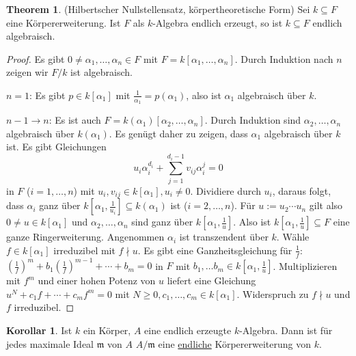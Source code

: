 \documentclass[
twoside=semi,
fontsize=12,
DIV=12, 
cleardoublepage=current,
leqno,
headings=optiontoheadandtoc, 
toc=idx
]{scrbook}
\newcommand{\brac}[1]{\left( #1 \right)}
\newcommand{\emphasize}[1]{\underline{#1}}
\theoremstyle{definition}
\newtheorem{korollar}[definition]{Korollar}
\newtheorem{theorem}[definition]{Theorem}
\begin{document}
	\begin{theorem}\label{1.2.9} (Hilbertscher Nullstellensatz, k\"orpertheoretische Form)\newline
		Sei $k \subseteq F$ eine K\"orpererweiterung. Ist $F$ als $k$-Algebra endlich erzeugt, so ist $k \subseteq F$ endlich algebraisch.
	\end{theorem}
	
	\begin{proof}\hfill\newline
		Es gibt $0\neq \alpha_1, \dots, \alpha_n \in F$ mit $F = k[\alpha_1, \dots, \alpha_n]$. Durch Induktion nach $n$ zeigen wir $F/k$ ist algebraisch.
		
		\noindent $n = 1$: Es gibt $p \in k[\alpha_1]$ mit $\frac{1}{\alpha_1} = p(\alpha_1)$, also ist $\alpha_1$ algebraisch \"uber $k$.
		
		\medskip\noindent
		$n-1 \to n$: Es ist auch $F = k(\alpha_1)[\alpha_2, \dots, \alpha_n]$. Durch Induktion sind $\alpha_2, \dots, \alpha_n$ algebraisch \"uber $k(\alpha_1)$. Es gen\"ugt daher zu zeigen,
		dass $\alpha_1$ algebraisch \"uber $k$ ist. Es gibt Gleichungen
			\[u_i\alpha_i^{d_i} + \sum_{j=1}^{d_i-1} v_{ij}\alpha_i^j = 0\]
		in $F$ ($i = 1, \dots, n$) mit $u_i, v_{ij} \in k[\alpha_1], u_i \neq 0$.
		Dividiere durch $u_i$, daraus folgt, dass $\alpha_i$ ganz \"uber $k[\alpha_1, \frac{1}{u_i}] \subseteq k(\alpha_1)$ ist ($i = 2, \dots, n$).
		F\"ur $u:= u_2 \cdots u_n$ gilt also $0 \neq u \in k[\alpha_1]$ und $\alpha_2, \dots, \alpha_n$ sind ganz \"uber $k[\alpha_1, \frac{1}{u}]$. 
		Also ist $k[\alpha_1, \frac{1}{u}] \subseteq F$ eine ganze Ringerweiterung.
		Angenommen $\alpha_i$ ist transzendent \"uber $k$. W\"ahle $f \in k[\alpha_1]$ irreduzibel mit $f \nmid u$. Es gibt eine Ganzheitsgleichung f\"ur $\frac{1}{f}$: $\brac{\frac{1}{f}}^m + b_1\brac{\frac{1}{f}}^{m-1}+\cdots + b_m = 0$ in $F$ mit $b_1, \dots b_m \in k[\alpha_1, \frac{1}{u}]$. Multiplizieren mit $f^m$ und einer hohen Potenz von $u$ liefert eine Gleichung $u^N+c_1f+\cdots+c_mf^m = 0$ mit $N \geq 0, c_1,\dots, c_m \in k[\alpha_1]$. Widerspruch zu $f\nmid u$ und $f$ irreduzibel.
	\end{proof}

	\begin{korollar}\label{1.2.10}\hfill\newline
		Ist $k$ ein K\"orper, $A$ eine endlich erzeugte $k$-Algebra. Dann ist f\"ur jedes maximale Ideal $\mathfrak{m}$ von $A$ $A/\mathfrak{m}$ eine \emphasize{endliche} K\"orpererweiterung von $k$.
	\end{korollar}
\end{document}
